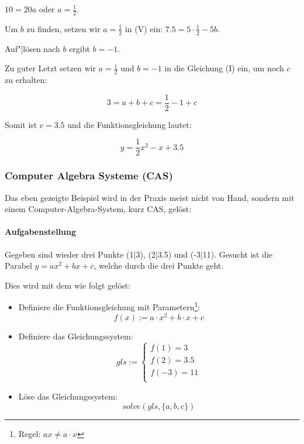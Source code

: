 $10 = 20a$ oder $a = \frac{1}{2}$.

Um $b$ zu finden, setzen wir $a = \frac{1}{2}$ in (V) ein: $7.5 =
5\cdot{}\frac{1}{2} - 5b$.

Auf"|lösen nach $b$ ergibt $b = -1$.

Zu guter Letzt setzen wir $a = \frac{1}{2}$ und $b=-1$ in die
Gleichung (I) ein, um noch $c$ zu erhalten:

$$3 = a + b + c = \frac{1}{2} - 1 + c$$

Somit ist $c=3.5$ und die Funktionsgleichung lautet:

$$y = \frac{1}{2}x^2 - x + 3.5$$


\newpage


\subsubsection{Computer Algebra Systeme (CAS)}
Das eben gezeigte Beispiel wird in der Praxis meist nicht von Hand,
sondern mit einem Computer-Algebra-System, kurz CAS, gelöst:

\paragraph{Aufgabenstellung}
Gegeben sind wieder drei Punkte (1|3), (2|3.5) und (-3|11).
Gesucht ist die Parabel $y = ax^2 + bx + c$, welche durch die drei
Punkte geht.

Dies wird mit dem \tinspire{} wie folgt gelöst:
\begin{itemize}
\item Definiere die Funktionsgleichung mit
  Parametern\footnote{\tinspire Regel: $ax\ne a\cdot{} x$}:\\
  $$f(x) := a\cdot{}x^2 + b\cdot{}x + c$$
\item Definiere das Gleichungssystem:
  $$gls := \left\{ \begin{array}{l}
    f(1) = 3\\
    f(2) = 3.5\\
    f(-3)= 11\\
  \end{array}\right.$$
\item Löse das Gleichungssystem:
  $$solve(gls,\{a, b, c\})$$
\end{itemize}

